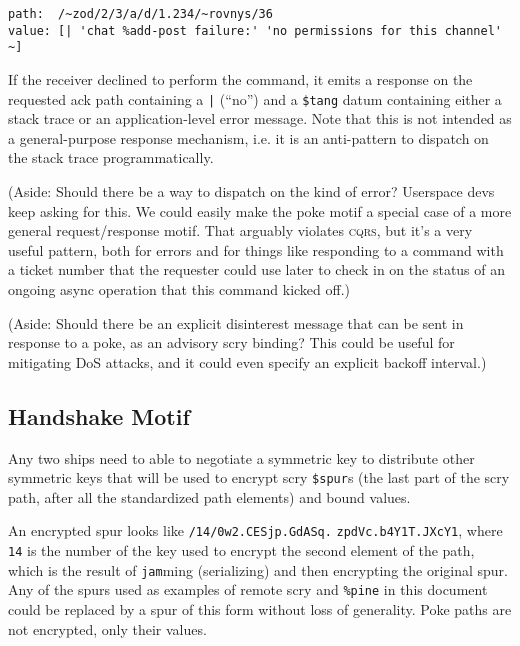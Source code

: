 \documentclass[twoside]{article}
\begin{document}
\begin{lstlisting}[style=listingcode]
path:  /~zod/2/3/a/d/1.234/~rovnys/36
value: [| 'chat %add-post failure:' 'no permissions for this channel' ~]
\end{lstlisting}

If the receiver declined to perform the command, it emits a response on the requested ack path containing a \lstinline[style=inlinecode]{|} (``no'') and a \lstinline[style=inlinecode]{$tang} datum containing either a stack trace or an application-level error message. Note that this is not intended as a general-purpose response mechanism, i.e. it is an anti-pattern to dispatch on the stack trace programmatically.

(Aside:  Should there be a way to dispatch on the kind of error? Userspace devs keep asking for this. We could easily make the poke motif a special case of a more general request/response motif. That arguably violates \textsc{cqrs}, but it's a very useful pattern, both for errors and for things like responding to a command with a ticket number that the requester could use later to check in on the status of an ongoing async operation that this command kicked off.)

(Aside: Should there be an explicit disinterest message that can be sent in response to a poke, as an advisory scry binding? This could be useful for mitigating DoS attacks, and it could even specify an explicit backoff interval.)

\subsection{Handshake Motif}

Any two ships need to able to negotiate a symmetric key to distribute other symmetric keys that will be used to encrypt scry \lstinline[style=inlinecode]{$spur}s (the last part of the scry path, after all the standardized path elements) and bound values.

An encrypted spur looks like \lstinline[style=inlinecode]{/14/0w2.CESjp.GdASq.} \lstinline[style=inlinecode]{zpdVc.b4Y1T.JXcY1}, where \lstinline[style=inlinecode]{14} is the number of the key used to encrypt the second element of the path, which is the result of \lstinline[style=inlinecode]{jam}ming (serializing) and then encrypting the original spur. Any of the spurs used as examples of remote scry and \lstinline[style=inlinecode]{%pine} in this document could be replaced by a spur of this form without loss of generality. Poke paths are not encrypted, only their values.
\end{document}

